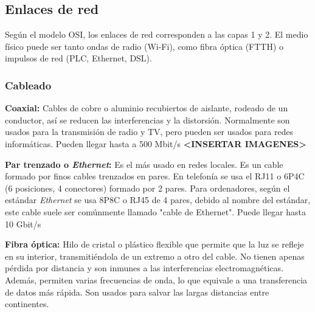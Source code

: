 \documentclass[a4paper, 11pt]{report} %
\begin{document}
\subsection{Enlaces de red}
Según el modelo OSI, los enlaces de red corresponden a las capas 1 y 2. El medio físico puede ser tanto ondas de radio (Wi-Fi), como fibra óptica (FTTH) o impulsos de red (PLC, Ethernet, DSL).

\subsubsection{Cableado}
\begin{description}
\item \textbf{Coaxial:} Cables de cobre o aluminio recubiertos de aislante, rodeado de un conductor, así se reducen las interferencias y la distorsión. Normalmente son usados para la transmisión de radio y TV, pero pueden ser usados para redes informáticas. Pueden llegar hasta a 500 Mbit/s \textbf{<INSERTAR IMAGENES>}
\item \textbf{Par trenzado o \textit{Ethernet}:} Es el más usado en redes locales. Es un cable formado por finos cables trenzados en pares. En telefonía se usa el RJ11 o 6P4C (6 posiciones, 4 conectores) formado por 2 pares. Para ordenadores, según el estándar \textit{Ethernet} se usa 8P8C o RJ45 de 4 pares, debido al nombre del estándar, este cable suele ser comúnmente llamado "cable de Ethernet". Puede llegar hasta 10 Gbit/s
\item \textbf{Fibra óptica:} Hilo de cristal o plástico flexible que permite que la luz se refleje en su interior, transmitiéndola de un extremo a otro del cable. No tienen apenas pérdida por distancia y son inmunes a las interferencias electromagnéticas. Además, permiten varias frecuencias de onda, lo que equivale a una transferencia de datos más rápida. Son usados para salvar las largas distancias entre continentes.
\end{description}
\end{document}
